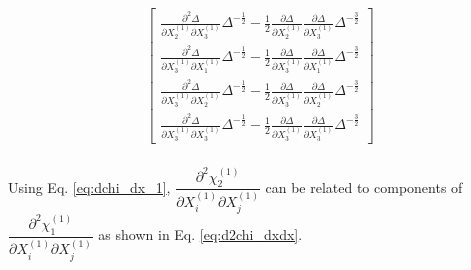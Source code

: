 \documentclass[12pt]{amsart}
\begin{document}
\begin{equation}
\begin{split}
\begin{bmatrix}
      \frac{\partial^2\Delta}{\partial X_2^{(1)} \partial X_3^{(1)}} \Delta^{-\frac{1}{2}} - \frac{1}{2}\frac{\partial\Delta}{\partial X_2^{(1)}} \frac{\partial\Delta}{\partial X_3^{(1)}} \Delta^{-\frac{3}{2}}\\
      \frac{\partial^2\Delta}{\partial X_3^{(1)} \partial X_1^{(1)}} \Delta^{-\frac{1}{2}} - \frac{1}{2}\frac{\partial\Delta}{\partial X_3^{(1)}} \frac{\partial\Delta}{\partial X_1^{(1)}} \Delta^{-\frac{3}{2}}\\
      \frac{\partial^2\Delta}{\partial X_3^{(1)} \partial X_2^{(1)}} \Delta^{-\frac{1}{2}} - \frac{1}{2}\frac{\partial\Delta}{\partial X_3^{(1)}} \frac{\partial\Delta}{\partial X_2^{(1)}} \Delta^{-\frac{3}{2}}\\
      \frac{\partial^2\Delta}{\partial X_3^{(1)} \partial X_3^{(1)}} \Delta^{-\frac{1}{2}} - \frac{1}{2}\frac{\partial\Delta}{\partial X_3^{(1)}} \frac{\partial\Delta}{\partial X_3^{(1)}} \Delta^{-\frac{3}{2}}
    \end{bmatrix}\\
  \end{split}
\end{equation}

Using Eq. \ref{eq:dchi_dx_1}, $\dfrac{\partial^2\chi_2^{(1)}}{\partial X_i^{(1)} \partial X_j^{(1)}}$ can be related to components of  $\dfrac{\partial^2\chi_1^{(1)}}{\partial X_i^{(1)} \partial X_j^{(1)}}$ as shown in Eq. \ref{eq:d2chi_dxdx}.
\end{document}
